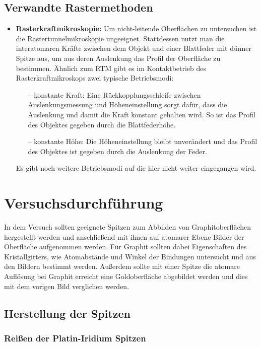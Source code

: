 \documentclass[10pt, a4paper]{article}
\begin{document}
\subsection{Verwandte Rastermethoden}
\begin{itemize}
  \item \textbf{Rasterkraftmikroskopie:} Um nicht-leitende Oberflächen zu untersuchen ist die Rastertunnelmikroskopie ungeeignet.
  Stattdessen nutzt man die interatomaren Kräfte zwischen dem Objekt und einer Blattfeder mit dünner Spitze aus, um aus deren Auslenkung das Profil der Oberfläche zu bestimmen.
  Ähnlich zum RTM gibt es im Kontaktbetrieb des Rasterkraftmikroskops zwei typische Betriebsmodi:
  \begin{itemize}
  \item[--] konstante Kraft: Eine Rückkopplungsschleife zwischen Auslenkungsmessung und Höheneinstellung sorgt dafür, dass die Auslenkung und damit die Kraft konstant gehalten wird.
  So ist das Profil des Objektes gegeben durch die Blattfederhöhe.
  \item[--] konstante Höhe: Die Höheneinstellung bleibt unverändert und das Profil des Objektes ist gegeben durch die Auslenkung der Feder.
  \end{itemize}
  Es gibt noch weitere Betriebsmodi auf die hier nicht weiter eingegangen wird.
\end{itemize}

\section{Versuchsdurchführung}

In dem Versuch sollten geeignete Spitzen zum Abbilden von Graphitoberflächen hergestellt werden und anschließend mit ihnen auf atomarer Ebene Bilder der Oberfläche aufgenommen werden.
Für Graphit sollten dabei Eigenschaften des Kristallgitters, wie Atomabstände und Winkel der Bindungen untersucht und aus den Bildern bestimmt werden. 
Außerdem sollte mit einer Spitze die atomare Auflösung bei Graphit erreicht eine Goldoberfläche abgebildet werden und dies mit dem vorigen Bild verglichen werden.

\subsection{Herstellung der Spitzen}

\subsubsection{Reißen der Platin-Iridium Spitzen}
\end{document}

